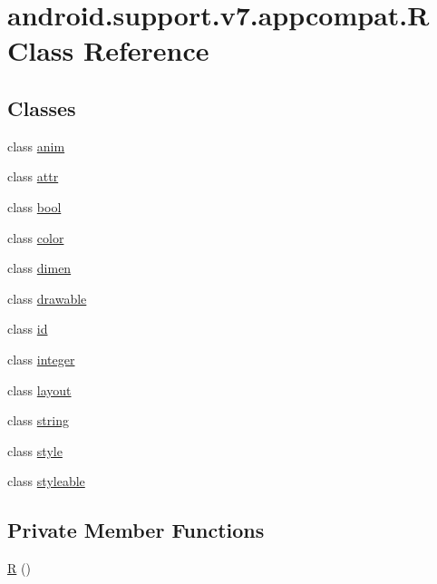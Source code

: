 \hypertarget{classandroid_1_1support_1_1v7_1_1appcompat_1_1_r}{}\section{android.\+support.\+v7.\+appcompat.\+R Class Reference}
\label{classandroid_1_1support_1_1v7_1_1appcompat_1_1_r}
\subsection*{Classes}
\begin{DoxyCompactItemize}
\item 
class \mbox{\hyperlink{classandroid_1_1support_1_1v7_1_1appcompat_1_1_r_1_1anim}{anim}}
\item 
class \mbox{\hyperlink{classandroid_1_1support_1_1v7_1_1appcompat_1_1_r_1_1attr}{attr}}
\item 
class \mbox{\hyperlink{classandroid_1_1support_1_1v7_1_1appcompat_1_1_r_1_1bool}{bool}}
\item 
class \mbox{\hyperlink{classandroid_1_1support_1_1v7_1_1appcompat_1_1_r_1_1color}{color}}
\item 
class \mbox{\hyperlink{classandroid_1_1support_1_1v7_1_1appcompat_1_1_r_1_1dimen}{dimen}}
\item 
class \mbox{\hyperlink{classandroid_1_1support_1_1v7_1_1appcompat_1_1_r_1_1drawable}{drawable}}
\item 
class \mbox{\hyperlink{classandroid_1_1support_1_1v7_1_1appcompat_1_1_r_1_1id}{id}}
\item 
class \mbox{\hyperlink{classandroid_1_1support_1_1v7_1_1appcompat_1_1_r_1_1integer}{integer}}
\item 
class \mbox{\hyperlink{classandroid_1_1support_1_1v7_1_1appcompat_1_1_r_1_1layout}{layout}}
\item 
class \mbox{\hyperlink{classandroid_1_1support_1_1v7_1_1appcompat_1_1_r_1_1string}{string}}
\item 
class \mbox{\hyperlink{classandroid_1_1support_1_1v7_1_1appcompat_1_1_r_1_1style}{style}}
\item 
class \mbox{\hyperlink{classandroid_1_1support_1_1v7_1_1appcompat_1_1_r_1_1styleable}{styleable}}
\end{DoxyCompactItemize}
\subsection*{Private Member Functions}
\begin{DoxyCompactItemize}
\item 
\mbox{\hyperlink{classandroid_1_1support_1_1v7_1_1appcompat_1_1_r_a1f2b7247035e93db2996bdfd46e318ae}{R}} ()
\end{DoxyCompactItemize}


